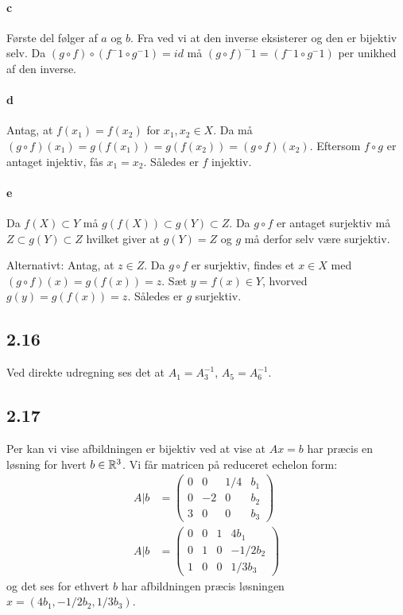 			\paragraph{c} Første del følger af $a$ og $b$. Fra \cite[Lemma 0.1.3]{hesselholt2017} ved vi at den inverse eksisterer og den er bijektiv selv. Da $(g \circ f) \circ (f^-1 \circ g^-1)=id$ må $(g \circ f)^-1=(f^-1 \circ g^-1)$ per unikhed af den inverse.

			\paragraph{d} Antag, at $f(x_1) = f(x_2)$ for $x_1, x_2 \in X$. Da må $(g \circ f)(x_1) = g(f(x_1)) = g(f(x_2)) = (g \circ f)(x_2)$. Eftersom $f \circ g$ er antaget injektiv, fås $x_1 = x_2$. Således er $f$ injektiv.

			\paragraph{e} Da $f(X)\subset Y$ må $g(f(X)) \subset g(Y) \subset Z$. Da $g \circ f$ er antaget surjektiv må $Z \subset g(Y) \subset Z$ hvilket giver at $g(Y)=Z$ og $g$ må derfor selv være surjektiv.
			
			Alternativt: Antag, at $z \in Z$. Da $g \circ f$ er surjektiv, findes et $x \in X$ med $(g \circ f)(x) = g(f(x)) = z$. Sæt $y = f(x) \in Y$, hvorved $g(y) = g(f(x)) = z$. Således er $g$ surjektiv.

		\subsection{2.16}

			Ved direkte udregning ses det at $A_1=A_3^{-1}$, $A_5=A_6^{-1}$. 

		\subsection{2.17} 

			Per \cite[sætning 2.4.9]{hesselholt2017} kan vi vise afbildningen er bijektiv ved at vise at $Ax=b$ har præcis en løsning for hvert $b\in \mathbb{R}^3$.  Vi får matricen på reduceret echelon form:
				\begin{align*}
					A|b&=\left(\begin{array}{ccc|c}{0} & {0} & {1 / 4} & {b_1} \\ {0} & {-2} & {0} & {b_2} \\ {3} & {0} & {0} & {b_3} \end{array}\right) \\
					A|b&=\left(\begin{array}{ccc|c}{0} & {0} & {1} & {4b_1} \\ {0} & {1} & {0} & {-1/2b_2} \\ {1} & {0} & {0} & {1/3b_3} \end{array}\right) 
				\end{align*} 
			og det ses for ethvert $b$ har afbildningen præcis løsningen $x=(4b_1,-1/2b_2,1/3b_3)$.

